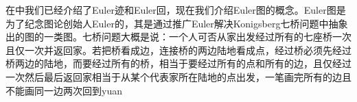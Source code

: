 
在中我们已经介绍了Euler迹和Euler回，现在我们介绍Euler图的概念。Euler图是为了纪念图论创始人Euler的，其是通过推广Euler解决Konigsberg七桥问题中抽象出的图的一类图。七桥问题大概是说：一个人可否从家出发经过所有的七座桥一次且仅一次并返回家。若把桥看成边，连接桥的两边陆地看成点，经过桥必须先经过桥两边的陆地，而要经过所有的桥，相当于要经过所有的点和所有的边，且仅经过一次然后最后返回家相当于从某个代表家所在陆地的点出发，一笔画完所有的边且不能画同一边两次回到yuan










